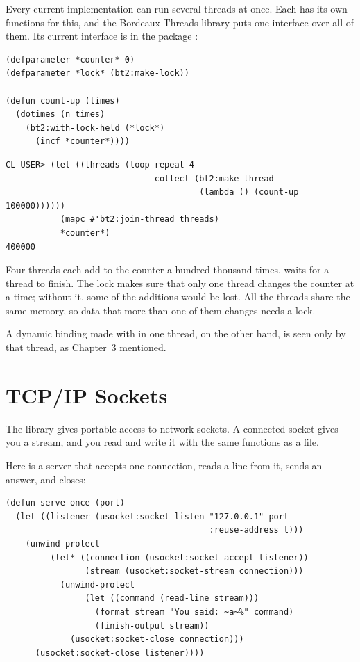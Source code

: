 Every current implementation can run several threads at once. Each
has its own functions for this, and the Bordeaux Threads library puts
one interface over all of them. Its current interface is in the
package :

\begin{verbatim}
(defparameter *counter* 0)
(defparameter *lock* (bt2:make-lock))

(defun count-up (times)
  (dotimes (n times)
    (bt2:with-lock-held (*lock*)
      (incf *counter*))))
\end{verbatim}

\begin{verbatim}
CL-USER> (let ((threads (loop repeat 4
                              collect (bt2:make-thread
                                       (lambda () (count-up 100000))))))
           (mapc #'bt2:join-thread threads)
           *counter*)
400000
\end{verbatim}

Four threads each add to the counter a hundred thousand times.
 waits for a thread to finish. The lock makes sure
that only one thread changes the counter at a time; without it, some
of the additions would be lost. All the threads share the same
memory, so data that more than one of them changes needs a lock.

A dynamic binding made with  in one thread, on the other
hand, is seen only by that thread, as Chapter~3 mentioned.

\section{TCP/IP Sockets}

The  library gives portable access to network
sockets. A connected socket gives you a stream, and you read and write
it with the same functions as a file.

Here is a server that accepts one connection, reads a line from it,
sends an answer, and closes:

\begin{verbatim}
(defun serve-once (port)
  (let ((listener (usocket:socket-listen "127.0.0.1" port
                                         :reuse-address t)))
    (unwind-protect
         (let* ((connection (usocket:socket-accept listener))
                (stream (usocket:socket-stream connection)))
           (unwind-protect
                (let ((command (read-line stream)))
                  (format stream "You said: ~a~%" command)
                  (finish-output stream))
             (usocket:socket-close connection)))
      (usocket:socket-close listener))))
\end{verbatim}

